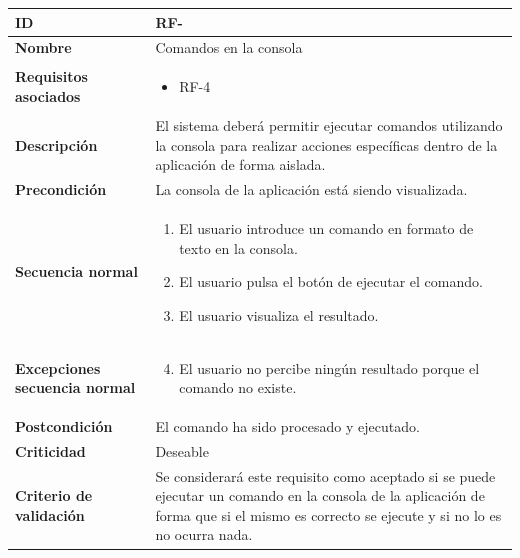 \begin{center}
	\begin{tabular}{ | p{4.7cm} | p{10cm} | } 
		\hline
		
		\textbf{ID} & RF-\arabic{contador_requisitos_funcionales}
		{contador_requisitos_funcionales} \\
		
		\hline 
		\textbf{Nombre} &
		Comandos en la consola\\ 
		
		\hline
		\textbf{Requisitos asociados} & 
		\begin{itemize}
			\item RF-4
		\end{itemize}\\
		
		\hline
		\textbf{Descripción} & 
		El sistema deberá permitir ejecutar comandos utilizando la consola para realizar acciones específicas dentro de la aplicación de forma aislada.\\
		
		\hline
		\textbf{Precondición} & 
		La consola de la aplicación está siendo visualizada.\\
		
		\hline
		\textbf{Secuencia normal} &
		\begin{enumerate}
			\item El usuario introduce un comando en formato de texto en la consola.
			\item El usuario pulsa el botón de ejecutar el comando.
			\item El usuario visualiza el resultado.
		\end{enumerate}
		\\
		
		\hline
		\textbf{Excepciones secuencia normal} &
		\begin{enumerate}
			\setcounter{enumi}{3}
			\item El usuario no percibe ningún resultado porque el comando no existe.
		\end{enumerate}
		\\
		
		\hline
		\textbf{Postcondición} & 
		El comando ha sido procesado y ejecutado.\\
		
		\hline 
		\textbf{Criticidad} &
		Deseable\\
		
		\hline 
		\textbf{Criterio de validación} & 
		Se considerará este requisito como aceptado si se puede ejecutar un comando en la consola de la aplicación de forma que si el mismo es correcto se ejecute y si no lo es no ocurra nada.\\
		
		\hline
	\end{tabular}
\end{center}

